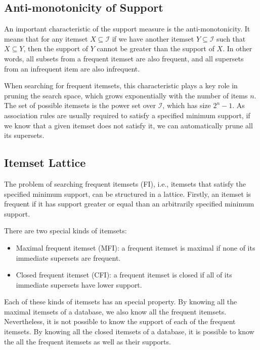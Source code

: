 \subsection{Anti-monotonicity of Support}

An important characteristic of the support measure is the anti-monotonicity. It means that for any itemset $X
\subseteq \mathcal{I}$ if we have another itemset $Y \subseteq \mathcal{I}$ such that $X \subseteq Y$, then the
support
of $Y$ cannot be greater than the support of $X$. In other words, all subsets from a frequent itemset are also
frequent,
and all supersets from an infrequent item are also infrequent.

When searching for frequent itemsets, this characteristic plays a key role in pruning the search space, which grows
exponentially with the number of items $n$. The set of possible itemsets is the power set over $\mathcal{I}$, which
has
size $2^n-1$. As association rules are usually required to satisfy a specified minimum support, if we know that a
given
itemset does not satisfy it, we can automatically prune all its supersets.

\subsection{Itemset Lattice}

The problem of searching frequent itemsets (FI), i.e., itemsets that satisfy the specified minimum support, can be
structured in a lattice. Firstly, an itemset is frequent if it has support greater or equal than an arbitrarily
specified minimum support.


There are two special kinds of itemsets:
\begin{itemize}
 \item Maximal frequent itemset (MFI): a frequent itemset is maximal if none of its immediate supersets are frequent.
 \item Closed frequent itemset (CFI): a frequent itemset is closed if all of its immediate supersets have lower
support.
\end{itemize}

Each of these kinds of itemsets has an special property. By knowing all the maximal itemsets of a database, we
also know all the frequent itemsets. Nevertheless, it is not possible to know the support of each of the frequent
itemsets. By knowing all the closed itemsets of a database, it is possible to know the all the frequent itemsets as
well as their supports.

